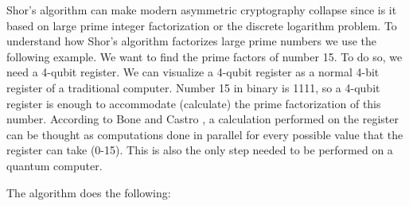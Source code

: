\documentclass[conference, letterpaper]{IEEEtran}
\begin{document}
Shor's algorithm can make modern asymmetric cryptography collapse since is it based on large prime integer factorization or the discrete logarithm problem. To understand how Shor's algorithm factorizes large prime numbers we use the following example. We want to find the prime factors of number 15. To do so, we need a 4-qubit register. We can visualize a 4-qubit register as a normal 4-bit register of a traditional computer. Number 15 in binary is 1111, so a 4-qubit register is enough to accommodate (calculate) the prime factorization of this number. According to Bone and Castro \cite{Bone1997}, a calculation performed on the register can be thought as computations done in parallel for every possible value that the register can take (0-15). This is also the only step needed to be performed on a quantum computer. 

The algorithm does the following: 
\end{document}
